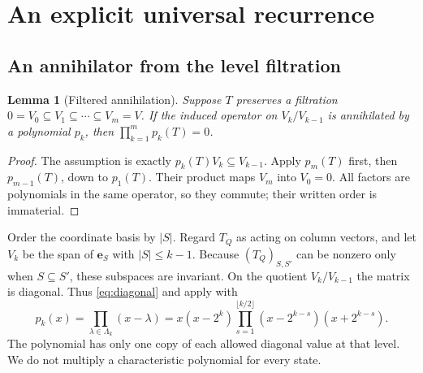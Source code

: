 \documentclass[11pt,letterpaper]{article}
\newtheorem{lemma}[theorem]{Lemma}
\theoremstyle{definition}
\newcommand{\1}{\mathbf 1}
\newcommand{\e}{\mathbf e}
\begin{document}
\section{An explicit universal recurrence}
\label{sec:universal}

\subsection{An annihilator from the level filtration}
\begin{lemma}[Filtered annihilation]\label{lem:filtration}
Suppose $T$ preserves a filtration
$0=V_0\subseteq V_1\subseteq\cdots\subseteq V_m=V$.
If the induced operator on $V_k/V_{k-1}$ is annihilated by a polynomial $p_k$,
then $\prod_{k=1}^mp_k(T)=0$.
\end{lemma}
\begin{proof}
The assumption is exactly $p_k(T)V_k\subseteq V_{k-1}$. Apply $p_m(T)$ first,
then $p_{m-1}(T)$, down to $p_1(T)$. Their product maps $V_m$ into $V_0=0$.
All factors are polynomials in the same operator, so they commute; their written
order is immaterial.
\end{proof}

Order the coordinate basis by $|S|$. Regard $T_Q$ as acting on column vectors,
and let $V_k$ be the span of $\e_S$ with $|S|\le k-1$. Because
$(T_Q)_{S,S'}$ can be nonzero only when $S\subseteq S'$, these subspaces are
invariant. On the quotient $V_k/V_{k-1}$ the matrix is diagonal. Thus
\eqref{eq:diagonal} and  apply with
\begin{equation}\label{eq:pk}
 p_k(x)=\prod_{\lambda\in\Lambda_k}(x-\lambda)
       =x(x-2^k)\prod_{s=1}^{\lfloor k/2\rfloor}
         (x-2^{k-s})(x+2^{k-s}).
\end{equation}
The polynomial has only one copy of each allowed diagonal value at that level.
We do not multiply a characteristic polynomial for every state.
\end{document}
